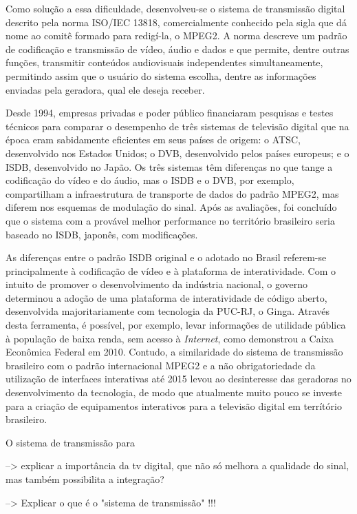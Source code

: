 \documentclass[
	12pt,				%
	openright,			%
	twoside,			%
	a4paper,			%
	english,			%
	french,				%
	brazil				%
	]{abntex2}
\begin{document}
Como solução a essa dificuldade, desenvolveu-se
o sistema de transmissão digital descrito pela norma ISO/IEC 13818, comercialmente conhecido pela sigla que dá nome ao
comitê formado para redigí-la, o MPEG2. A norma descreve um padrão de codificação e transmissão de vídeo, áudio e dados
e que permite, dentre outras funções, transmitir conteúdos audiovisuais independentes simultaneamente, permitindo
assim que o usuário do sistema escolha, dentre as informações enviadas pela geradora, qual ele deseja receber.

Desde 1994, empresas privadas e poder público financiaram pesquisas e testes técnicos para comparar o desempenho de
três sistemas de televisão digital que na época eram sabidamente eficientes em seus países de origem: o ATSC,
desenvolvido nos Estados Unidos; o DVB, desenvolvido pelos países europeus; e o ISDB, desenvolvido no Japão. Os três
sistemas têm diferenças no que tange a codificação do vídeo e do áudio, mas o ISDB e o DVB, por exemplo, compartilham
a infraestrutura de transporte de dados do padrão MPEG2, mas diferem nos esquemas de modulação do sinal. Após as
avaliações, foi concluído que o sistema com a provável melhor performance no território brasileiro seria baseado
no ISDB, japonês, com modificações.

As diferenças entre o padrão ISDB original e o adotado no Brasil referem-se principalmente à codificação de vídeo e à
plataforma de interatividade. Com o intuito de promover o desenvolvimento da indústria nacional, o governo determinou a adoção de uma
plataforma de interatividade de código aberto, desenvolvida majoritariamente com tecnologia da PUC-RJ, o Ginga.
Através desta ferramenta, é possível, por exemplo, levar informações de utilidade pública à população de baixa renda, sem acesso
à \textit{Internet}, como demonstrou a Caixa Econômica Federal em 2010.
Contudo, a similaridade do sistema de transmissão brasileiro com o padrão internacional MPEG2 e a não
obrigatoriedade da utilização de interfaces interativas até 2015 levou ao desinteresse das geradoras no desenvolvimento da tecnologia,
de modo que atualmente muito pouco se investe para a criação de equipamentos interativos para a televisão digital em terrítório
brasileiro.

O sistema de transmissão para 

--> explicar a importância da tv digital, que não só melhora a qualidade do sinal, mas também possibilita 
a integração?

 --> Explicar o que é o "sistema de transmissão" !!!
 
\end{document}
